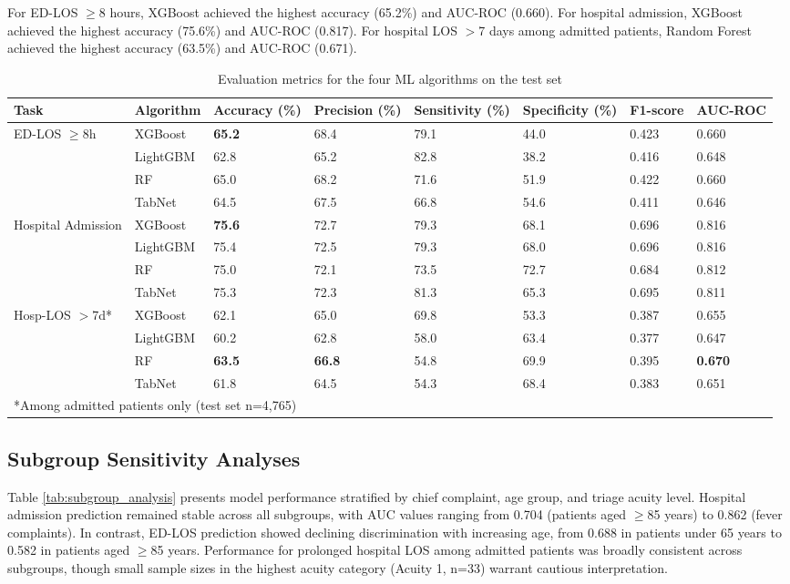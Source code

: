 \documentclass[harvard,article]{frontiersinFPHY_FAMS}
\begin{document}
For ED-LOS $\geq$8 hours, XGBoost achieved the highest accuracy (65.2\%) and AUC-ROC (0.660). For hospital admission, XGBoost achieved the highest accuracy (75.6\%) and AUC-ROC (0.817). For hospital LOS $>$7 days among admitted patients, Random Forest achieved the highest accuracy (63.5\%) and AUC-ROC (0.671).

\begin{table}[t]
\centering
\caption{Evaluation metrics for the four ML algorithms on the test set}
\label{tab:results}
\begin{tabular}{p{3.2cm}p{2.0cm}p{1.7cm}p{1.7cm}p{1.7cm}p{1.7cm}p{1.2cm}p{1.2cm}}
\toprule
\textbf{Task} & \textbf{Algorithm} & \textbf{Accuracy (\%)} & \textbf{Precision (\%)} & \textbf{Sensitivity (\%)} & \textbf{Specificity (\%)} & \textbf{F1-score} & \textbf{AUC-ROC} \\
\midrule
\multirow{4}{*}{ED-LOS $\geq$8h} & XGBoost & \textbf{65.2} & 68.4 & 79.1 & 44.0 & 0.423 & 0.660 \\
 & LightGBM & 62.8 & 65.2 & 82.8 & 38.2 & 0.416 & 0.648 \\
 & RF & 65.0 & 68.2 & 71.6 & 51.9 & 0.422 & 0.660 \\
 & TabNet & 64.5 & 67.5 & 66.8 & 54.6 & 0.411 & 0.646 \\
\midrule
\multirow{4}{*}{Hospital Admission} & XGBoost & \textbf{75.6} & 72.7 & 79.3 & 68.1 & 0.696 & 0.816 \\
 & LightGBM & 75.4 & 72.5 & 79.3 & 68.0 & 0.696 & 0.816 \\
 & RF & 75.0 & 72.1 & 73.5 & 72.7 & 0.684 & 0.812 \\
 & TabNet & 75.3 & 72.3 & 81.3 & 65.3 & 0.695 & 0.811 \\
\midrule
\multirow{4}{*}{Hosp-LOS $>$7d*} & XGBoost & 62.1 & 65.0 & 69.8 & 53.3 & 0.387 & 0.655 \\
 & LightGBM & 60.2 & 62.8 & 58.0 & 63.4 & 0.377 & 0.647 \\
 & RF & \textbf{63.5} & \textbf{66.8} & 54.8 & 69.9 & 0.395 & \textbf{0.670} \\
 & TabNet & 61.8 & 64.5 & 54.3 & 68.4 & 0.383 & 0.651 \\
\bottomrule
\multicolumn{8}{p{12cm}}{*Among admitted patients only (test set n=4,765)} \\
\end{tabular}
\end{table}

\subsection{Subgroup Sensitivity Analyses}
Table \ref{tab:subgroup_analysis} presents model performance stratified by chief complaint, age group, and triage acuity level. Hospital admission prediction remained stable across all subgroups, with AUC values ranging from 0.704 (patients aged $\geq$85 years) to 0.862 (fever complaints). In contrast, ED-LOS prediction showed declining discrimination with increasing age, from 0.688 in patients under 65 years to 0.582 in patients aged $\geq$85 years. Performance for prolonged hospital LOS among admitted patients was broadly consistent across subgroups, though small sample sizes in the highest acuity category (Acuity 1, n=33) warrant cautious interpretation.
\end{document}
